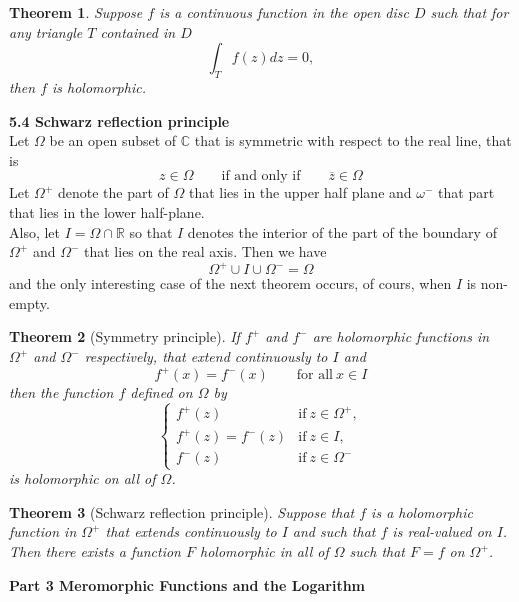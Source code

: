 \documentclass{article}
\newtheorem{theorem}{Theorem}
\theoremstyle{definition}
\theoremstyle{remark}
\begin{document}
    \begin{theorem}
        Suppose $f$ is a continuous function in the open disc $D$ such that for any triangle $T$ contained in $D$
        \[ \int_T f(z)dz = 0, \]
        then $f$ is holomorphic.
    \end{theorem}

    \textbf{5.4 Schwarz reflection principle}\\

    Let $\Omega$ be an open subset of $\mathbb{C}$ that is symmetric with respect to the real line, that is
    \[ z\in\Omega\qquad\text{if and only if}\qquad\overline{z}\in\Omega \]
    Let $\Omega^+$ denote the part of $\Omega$ that lies in the upper half plane and $\omega^-$ that part that lies in the lower
    half-plane.\\
    Also, let $I = \Omega\cap\mathbb{R}$ so that $I$ denotes the interior of the part of the boundary of $\Omega^+$ and $\Omega^-$ that
    lies on the real axis. Then we have
    \[ \Omega^+ \cup I \cup \Omega^- = \Omega \]
    and the only interesting case of the next theorem occurs, of cours, when $I$ is non-empty.

    \begin{theorem}[Symmetry principle]
        If $f^+$ and $f^-$ are holomorphic functions in $\Omega^+$ and $\Omega^-$ respectively, that extend continuously to $I$ and
        \[ f^+(x) = f^-(x)\qquad\text{for all}\:x\in I \]
        then the function $f$ defined on $\Omega$ by
        \[ 
            \begin{cases}
                f^+(z) & \text{if}\: z\in\Omega^+,\\
                f^+(z)=f^-(z) & \text{if}\: z\in I,\\
                f^-(z) & \text{if}\: z\in\Omega^-
            \end{cases}
        \]
        is holomorphic on all of $\Omega$.
    \end{theorem}

    \begin{theorem}[Schwarz reflection principle]
        Suppose that $f$ is a holomorphic function in $\Omega^+$ that extends continuously to $I$ and such that $f$ is real-valued
        on $I$. Then there exists a function $F$ holomorphic in all of $\Omega$ such that $F = f$ on $\Omega^+$.
    \end{theorem}

    \newpage

    \textbf{Part 3 Meromorphic Functions and the Logarithm}
\end{document}
